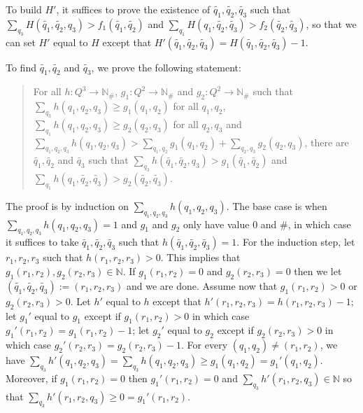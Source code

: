 \documentclass[10pt,a4paper]{article}
\let\mathbb\mathds
\renewcommand{\geq}{\geqslant}
\newcommand{\nats}{\mathbb{N}}
\newcommand{\deff}{:=}
\newcommand*{\states}{Q}
\newcommand*{\dummysymb}{\#}
\newcommand*{\natsanddummy}{\nats_{\dummysymb}}
\begin{document}
\begin{appendixproof}
	To build \(H'\), it suffices to prove the existence of \(\tilde{q_1},\tilde{q_2},\tilde{q_3}\) such that \linebreak\(\sum_{q_3} H(\tilde{q_1},\tilde{q_2}, q_3) > f_1(\tilde{q_1},\tilde{q_2})\) and \(\sum_{q_1} H(q_1,\tilde{q_2},\tilde{q_3}) > f_{2}(\tilde{q_2}, \tilde{q_3})\), so that we can set \(H'\) equal to \(H\) except that \(H'(\tilde{q_1},\tilde{q_2},\tilde{q_3}) = H(\tilde{q_1},\tilde{q_2},\tilde{q_3}) -1\).

	To find \(\tilde{q_1},\tilde{q_2}\) and \(\tilde{q_3}\), we prove the following statement:
	\begin{quote}
		For all \(h:\states^3 \to \natsanddummy\), \(g_1: \states^2 \to \natsanddummy\) and \(g_2: \states^2 \to \natsanddummy\) such that \(\sum_{q_3} h(q_1,q_2,q_3) \geq g_1(q_1,q_2)\) for all \(q_1,q_2\), \(\sum_{q_1} h(q_1,q_2,q_3) \geq g_2(q_2,q_3)\) for all \(q_2,q_3\) and \\\(\sum_{q_1,q_2,q_3} h(q_1,q_2,q_3) > \sum_{q_1,q_2} g_1(q_1,q_2) + \sum_{q_2,q_3} g_2(q_2,q_3)\), there are \(\tilde{q_1}, \tilde{q_2}\) and \(\tilde{q_3}\) such that \(\sum_{q_3} h(\tilde{q_1},\tilde{q_2},q_3) > g_1(\tilde{q_1},\tilde{q_2})\) and \(\sum_{q_1} h(q_1,\tilde{q_2}, \tilde{q_3}) > g_2(\tilde{q_2},\tilde{q_3})\).
	\end{quote}
	The proof is by induction on \(\sum_{q_1,q_2,q_3} h(q_1,q_2,q_3)\).
	The base case is when \linebreak \(\sum_{q_1,q_2,q_3} h(q_1,q_2,q_3) \allowbreak = 1\) and \(g_1\) and \(g_2\) only have value \(0\) and \(\dummysymb\), in which case it suffices to take \(\tilde{q_1},\tilde{q_2}, \tilde{q_3}\) such that \(h(\tilde{q_1}, \tilde{q_2}, \tilde{q_3}) = 1\).
	For the induction step, let \(r_1,r_2,r_3\) such that \(h(r_1,r_2,r_3) > 0\).
	This implies that \(g_1(r_1,r_2), g_2(r_2,r_3) \in \nats\).
	If \(g_1(r_1,r_2) =0\) and \(g_2(r_2,r_3) = 0\) then we let \((\tilde{q_1}, \tilde{q_2}, \tilde{q_3}) \deff (r_1,r_2,r_3)\) and we are done.
	Assume now that \(g_1(r_1,r_2) >0\) or \(g_2(r_2,r_3)>0\).
	Let \(h'\) equal to \(h\) except that \(h'(r_1,r_2,r_3) = h(r_1,r_2,r_3) -1\); let \(g_1'\) equal to \(g_1\) except if \(g_1(r_1,r_2)>0\) in which case \(g_1'(r_1,r_2) = g_1(r_1,r_2) - 1\); let \(g_2'\) equal to \(g_2\) except if \(g_2(r_2,r_3) >0\) in which case \(g_2'(r_2,r_3) = g_2(r_2,r_3) -1\).
	For every \((q_1,q_2) \ne (r_1,r_2)\), we have \(\sum_{q_3} h'(q_1,q_2,q_3) = \sum_{q_3} h(q_1,q_2,q_3) \geq g_1(q_1,q_2) = g_1'(q_1,q_2)\).
	Moreover, if \(g_1(r_1,r_2) = 0\) then \(g_1'(r_1,r_2) =0\) and \(\sum_{q_3} h'(r_1,r_2,q_3) \in \nats\) so that \(\sum_{q_3} h'(r_1,r_2,q_3) \geq 0 = g_1'(r_1,r_2)\).

\end{appendixproof}
\end{document}
